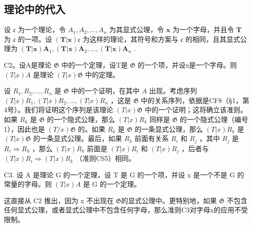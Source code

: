 \subsection{理论中的代入}

设 \(\mathfrak{c}\) 为一个理论，令 \(A_{1}, A_{2}, \ldots, A_{n}\) 为其显式公理，令 \(\pmb{x}\) 为一个字母，并且令 \(\pmb{T}\) 为 \(\mathfrak{c}\) 的一项。设 \((\pmb{T}|\pmb{x})\mathfrak{c}\) 为这样的理论，其符号和方案与 \(\mathfrak{c}\) 的相同，且其显式公理为 \((\pmb{T}|\pmb{x})\pmb{A}_{1}, (\pmb{T}|\pmb{x})\pmb{A}_{2}, \ldots, (\pmb{T}|\pmb{x})\pmb{A}_{n}\) .

C2。设A是理论 \(\mathfrak{G}\) 中的一个定理，设T是 \(\mathfrak{G}\) 的一个项，并设x是一个字母。则 \((T|x)A\) 是理论 \((T|x)\mathfrak{G}\) 中的定理。

设 \(R_1, R_2, \ldots, R_n\) 是 \(\mathfrak{G}\) 中的一个证明，在其中 \(A\) 出现。考虑序列 \((T|x)R_1, (T|x)R_2, \ldots, (T|x)R_n\) ，这是 \(\mathfrak{G}\) 中的关系序列，依据是CF8（§1，第4号）。我们将证明这个序列是该理论 \((T|x)\mathfrak{G}\) 中的一个证明；这将确立该准则。如果 \(R_k\) 是 \(\mathfrak{G}\) 的一个隐式公理，那么 \((T|x)R_k\) 同样是 \(\mathfrak{G}\) 的一个隐式公理（编号1），因此也是 \((T/x)\mathfrak{G}\) 的。如果 \(R_k\) 是 \(\mathfrak{G}\) 的一条显式公理，那么 \((T|x)R_k\) 是 \((T|x)\mathfrak{G}\) 的一条显式公理。最后，如果 \(R_k\) 前面有关系 \(R_i\) 和 \(R_j\) ，其中 \(R_j\) 是 \(R_i \Longrightarrow R_k\) ，那么 \((T|x)R_k\) 前面是 \((T|x)R_i\) 和 \((T|x)R_j\) ，后者与 \((T|x)R_i \Longrightarrow (T|x)R_k\) （准则CS5）相同。

C3. 设 A 是理论 G 的一个定理，设 T 是 G 的一个项，并设 x 是一个不是 G 的常量的字母。则 \((T|x)A\) 是 G 的一个定理。

这直接从 C2 推出，因为 x 不出现在 \(\mathfrak{G}\)的显式公理中。更特别地，如果 \(\mathfrak{G}\) 不包含任何显式公理，或者显式公理中不包含任何字母，那么准则C3对字母x的应用不受限制。

